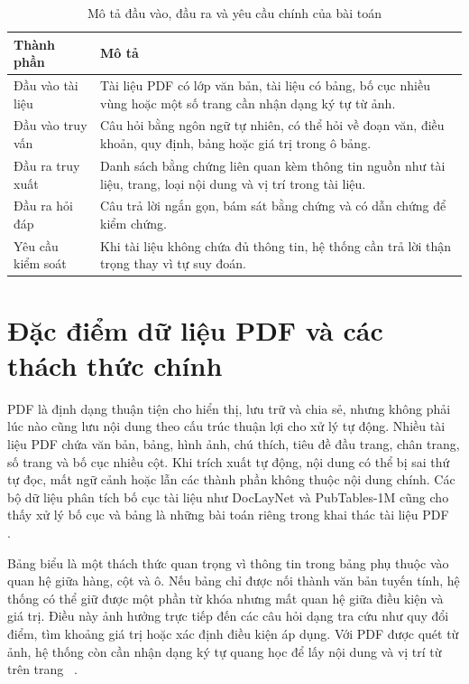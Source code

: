 \documentclass[../DoAn.tex]{subfiles}
\begin{document}
\begin{table}[H]
\centering
\small
\renewcommand{\arraystretch}{1.2}
\caption{Mô tả đầu vào, đầu ra và yêu cầu chính của bài toán}
\label{tab:problem-input-output}
\begin{tabularx}{\textwidth}{
    |>{\raggedright\arraybackslash}p{}
    |>{\raggedright\arraybackslash}X|
}
\hline
\textbf{Thành phần} & \textbf{Mô tả} \\
\hline
Đầu vào tài liệu &
Tài liệu PDF có lớp văn bản, tài liệu có bảng, bố cục nhiều vùng hoặc một số
trang cần nhận dạng ký tự từ ảnh. \\
\hline
Đầu vào truy vấn &
Câu hỏi bằng ngôn ngữ tự nhiên, có thể hỏi về đoạn văn, điều khoản, quy định,
bảng hoặc giá trị trong ô bảng. \\
\hline
Đầu ra truy xuất &
Danh sách bằng chứng liên quan kèm thông tin nguồn như tài liệu, trang, loại
nội dung và vị trí trong tài liệu. \\
\hline
Đầu ra hỏi đáp &
Câu trả lời ngắn gọn, bám sát bằng chứng và có dẫn chứng để kiểm chứng. \\
\hline
Yêu cầu kiểm soát &
Khi tài liệu không chứa đủ thông tin, hệ thống cần trả lời thận trọng thay vì tự
suy đoán. \\
\hline
\end{tabularx}
\end{table}

\section{Đặc điểm dữ liệu PDF và các thách thức chính}
\label{section:pdf-data-characteristics}

PDF là định dạng thuận tiện cho hiển thị, lưu trữ và chia sẻ, nhưng không phải lúc
nào cũng lưu nội dung theo cấu trúc thuận lợi cho xử lý tự động. Nhiều tài liệu PDF
chứa văn bản, bảng, hình ảnh, chú thích, tiêu đề đầu trang, chân trang, số trang và
bố cục nhiều cột. Khi trích xuất tự động, nội dung có thể bị sai thứ tự đọc, mất ngữ
cảnh hoặc lẫn các thành phần không thuộc nội dung chính. Các bộ dữ liệu phân
tích bố cục tài liệu như DocLayNet và PubTables-1M cũng cho thấy xử lý bố cục và
bảng là những bài toán riêng trong khai thác tài liệu PDF~
\cite{pfitzmann2022doclaynet,smock2022pubtables}.

Bảng biểu là một thách thức quan trọng vì thông tin trong bảng phụ thuộc vào quan
hệ giữa hàng, cột và ô. Nếu bảng chỉ được nối thành văn bản tuyến tính, hệ thống có
thể giữ được một phần từ khóa nhưng mất quan hệ giữa điều kiện và giá trị. Điều
này ảnh hưởng trực tiếp đến các câu hỏi dạng tra cứu như quy đổi điểm, tìm khoảng
giá trị hoặc xác định điều kiện áp dụng. Với PDF được quét từ ảnh, hệ thống còn
cần nhận dạng ký tự quang học để lấy nội dung và vị trí từ trên trang~
\cite{du2020ppocr}.
\end{document}
